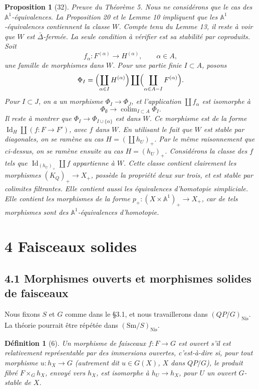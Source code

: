 \documentclass[11pt]{article}
\newcommand{\Aone}{\mathbb A^1}
\newcommand{\Nis}{\mathrm{Nis}}
\newcommand{\Sm}{\mathrm{Sm}}
\theoremstyle{deligne}
\newtheorem*{proposition*}{Proposition}
\newtheorem*{definition*}{Définition}
\newcommand{\colim}{\operatorname{colim}}
\newcommand{\Id}{\operatorname{Id}}
\begin{document}
\begin{proposition*}[32]
Preuve du Théorème 5. Nous ne considérons que le cas des \(\Aone\)-équivalences. La Proposition 20 et le Lemme 10 impliquent que les \(\Aone\)-équivalences contiennent la classe \(W\). Compte tenu du Lemme 13, il reste à voir que \(W\) est \(\bar\Delta\)-fermée. La seule condition à vérifier est sa stabilité par coproduits. Soit
\[
f_\alpha:F^{(\alpha)}\longrightarrow H^{(\alpha)},\qquad \alpha\in A,
\]
une famille de morphismes dans \(W\). Pour une partie finie \(I\subset A\), posons
\[
\Phi_I=\Bigl(\coprod_{\alpha\in I} H^{(\alpha)}\Bigr)\coprod\Bigl(\coprod_{\alpha\in A-I}F^{(\alpha)}\Bigr).
\]
Pour \(I\subset J\), on a un morphisme \(\Phi_I\to\Phi_J\), et l'application \(\coprod f_\alpha\) est isomorphe à
\[
\Phi_\emptyset\longrightarrow \colim_{I\subset A}\Phi_I.
\]
Il reste à montrer que \(\Phi_I\to\Phi_{I\cup\{\alpha\}}\) est dans \(W\). Ce morphisme est de la forme \(\Id_H\coprod(f:F\to F')\), avec \(f\) dans \(W\). En utilisant le fait que \(W\) est stable par diagonales, on se ramène au cas \(H=(\coprod h_U)_+\). Par le même raisonnement que ci-dessus, on se ramène ensuite au cas \(H=(h_U)_+\). Considérons la classe des \(f\) tels que \(\Id_{(h_U)_+}\coprod f\) appartienne à \(W\). Cette classe contient clairement les morphismes \((K_Q)_+\to X_+\), possède la propriété deux sur trois, et est stable par colimites filtrantes. Elle contient aussi les équivalences d'homotopie simpliciale. Elle contient les morphismes de la forme \(p_+:(X\times\Aone)_+\to X_+\), car de tels morphismes sont des \(\Aone\)-équivalences d'homotopie.
\end{proposition*}

\section*{4 Faisceaux solides}

\subsection*{4.1 Morphismes ouverts et morphismes solides de faisceaux}

Nous fixons \(S\) et \(G\) comme dans le §3.1, et nous travaillerons dans \((QP/G)_{\Nis}\). La théorie pourrait être répétée dans \((\Sm/S)_{\Nis}\).

\begin{definition*}[6]
Un morphisme de faisceaux \(f:F\to G\) est ouvert s'il est relativement représentable par des immersions ouvertes, c'est-à-dire si, pour tout morphisme \(u:h_X\to G\) (autrement dit \(u\in G(X)\), \(X\) dans \(QP/G\)), le produit fibré \(F\times_G h_X\), envoyé vers \(h_X\), est isomorphe à \(h_U\to h_X\), pour \(U\) un ouvert \(G\)-stable de \(X\).
\end{definition*}
\end{document}
